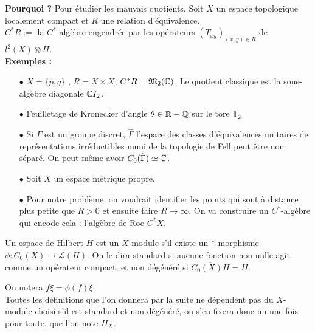 \documentclass{beamer}
\begin{document}
\begin{frame}
\textbf{Pourquoi ?} 
Pour étudier les mauvais quotients. Soit $X$ un espace topologique localement compact et $R$ une relation d'équivalence.\\
$C^* R :=$ la $C^*$-algèbre engendrée par les opérateurs $(T_{xy})_{(x,y)\in R}$ de $l^2(X)\otimes H$.\\
\textbf{Exemples :}
\begin{itemize}
\item[$\bullet$] $X=\{p,q\}$ , $R=X\times X$, $C^* R = \mathfrak M_2(\mathbb C)$. Le quotient classique est la sous-algèbre diagonale $\mathbb C I_2$.
\item[$\bullet$] Feuilletage de Kronecker d'angle $\theta\in \mathbb R-\mathbb Q$ sur le tore $\mathbb T_2$
\item[$\bullet$] Si $\Gamma$ est un groupe discret, $\hat\Gamma$ l'espace des classes d'équivalences unitaires de représentations irréductibles muni de la topologie de Fell peut être non séparé. On peut même avoir $C_0(\hat \Gamma)\simeq \mathbb C$.
\end{itemize}
\end{frame}

\begin{frame}
\begin{itemize}
\item[$\bullet$] Soit $X$ un espace métrique propre. %
\item[$\bullet$] Pour notre problème, on voudrait identifier les points qui sont à distance plus petite que $R>0$ et ensuite faire $R\rightarrow \infty$. On va construire un $C^*$-algèbre qui encode cela : l'algèbre de Roe $C^* X$.\\
\end{itemize}

\begin{definition}
Un espace de Hilbert $H$ est un $X$-module s'il existe un $*$-morphisme $\phi : C_0(X)\rightarrow \mathcal L(H)$. On le dira standard si aucune fonction non nulle agit comme un opérateur compact, et non dégénéré si $\overline{C_0(X)H}=H$.
\end{definition}
On notera $f\xi= \phi(f)\xi$.\\
Toutes les définitions que l'on donnera par la suite ne dépendent pas du $X$-module choisi s'il est standard et non dégénéré, on s'en fixera donc un une fois pour toute, que l'on note $H_X$.
\end{frame}
\end{document}
